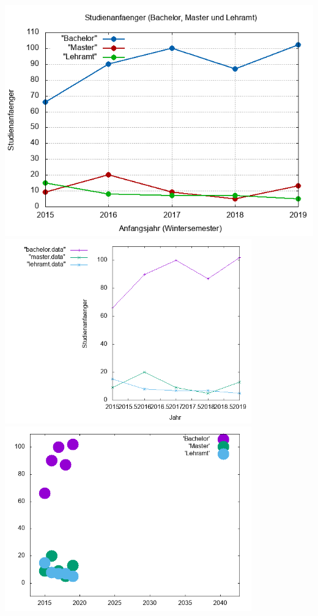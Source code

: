 \documentclass[12pt,fleqn] {article}
\author{Daniel Krall (11742259)}
\date{30.01.2020}
\title{\vspace{-3cm}}
\begin{document}
	\maketitle
	\thispagestyle{empty} %
	{\centering
		\hspace*{-1.5cm}
		\includegraphics[width=15cm]{Anfaenger.png}
		\includegraphics[height=8cm]{studenten.png} \\
		\includegraphics[height=8cm]{new.png} \\
}
\end{document}
